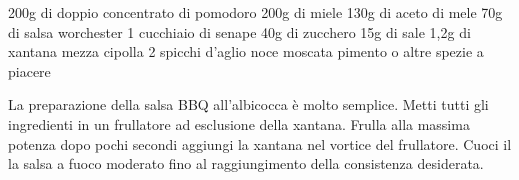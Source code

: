 \label{salsa-bbq}
\serves{-}
\vegetarian
\begin{ingreds}
	200g di doppio concentrato di pomodoro
	200g di miele
	130g di aceto di mele
	70g di salsa worchester
	1 cucchiaio di senape
	40g di zucchero
	15g di sale
	1,2g di xantana
	mezza cipolla
	2 spicchi d'aglio
	noce moscata
	pimento o altre spezie a piacere

\end{ingreds}

\begin{method}
La preparazione della salsa BBQ all'albicocca è molto semplice. Metti tutti gli ingredienti in un frullatore ad esclusione della xantana. Frulla alla massima potenza dopo pochi secondi aggiungi la xantana nel vortice del frullatore.
Cuoci il la salsa a fuoco moderato fino al raggiungimento della consistenza desiderata.
\end{method}



